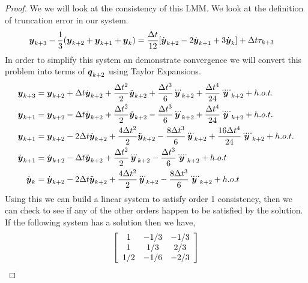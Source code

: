 \documentclass{article}
\begin{document}
\begin{enumerate}[label=\alph*)]
\begin{proof}
        We we will look at the consistency of this LMM. We look at the
        definition of truncation error in our system. 
        \begin{align*}
            \boldsymbol{y}_{k+3} - \frac{1}{3}(\boldsymbol{y}_{k+2} + \boldsymbol{y}_{k+1} + \boldsymbol{y}_{k}) &=
            \frac{\Delta t}{12}[\dot{\boldsymbol{y}}_{k+2} - 2\dot{\boldsymbol{y}}_{k+1} + 3\dot{\boldsymbol{y}}_{k}] + \Delta t
            \tau_{k+3}
        \end{align*}
        In order to simplify this system an demonstrate convergence we will
        convert this problem into terms of $\boldsymbol{q}_{k+2}$ using Taylor
        Expansions.
        \begin{align}
            \boldsymbol{y}_{k+3} &= \boldsymbol{y}_{k+2} + \Delta t \dot{\boldsymbol{y}}_{k+2} +
            \frac{\Delta t^2}{2}\ddot{\boldsymbol{y}}_{k+2} +
            \frac{\Delta t^3}{6}\dddot{\boldsymbol{y}}_{k+2} +
            \frac{\Delta t^4}{24}\ddddot{\boldsymbol{y}}_{k+2} +
            h.o.t.\\
            \boldsymbol{y}_{k+1} &= \boldsymbol{y}_{k+2} - \Delta t \dot{\boldsymbol{y}}_{k+2} +
            \frac{\Delta t^2}{2}\ddot{\boldsymbol{y}}_{k+2} -
            \frac{\Delta t^3}{6}\dddot{\boldsymbol{y}}_{k+2} +
            \frac{\Delta t^4}{24}\ddddot{\boldsymbol{y}}_{k+2} +
            h.o.t.\\
            \boldsymbol{y}_{k+1} &= \boldsymbol{y}_{k+2} - 2\Delta t \dot{\boldsymbol{y}}_{k+2} +
            \frac{4\Delta t^2}{2}\ddot{\boldsymbol{y}}_{k+2} -
            \frac{8\Delta t^3}{6}\dddot{\boldsymbol{y}}_{k+2} +
            \frac{16\Delta t^4}{24}\ddddot{\boldsymbol{y}}_{k+2} +
            h.o.t.\\
            \dot{\boldsymbol{y}}_{k+1} &= \dot{\boldsymbol{y}}_{k+2} - \Delta t \ddot{\boldsymbol{y}}_{k+2} + 
            \frac{\Delta t^2}{2}\dddot{\boldsymbol{y}}_{k+2} -
            \frac{\Delta t^3}{6}\ddddot{\boldsymbol{y}}_{k+2} + h.o.t\\
            \dot{\boldsymbol{y}}_{k} &= \dot{\boldsymbol{y}}_{k+2} - 2\Delta t \ddot{\boldsymbol{y}}_{k+2} + 
            \frac{4\Delta t^2}{2}\dddot{\boldsymbol{y}}_{k+2} -
            \frac{8\Delta t^3}{6}\ddddot{\boldsymbol{y}}_{k+2} + h.o.t
        \end{align}
        Using this we can build a linear system to satisfy order 1 consistency,
        then we can check to see if any of the other orders happen to be
        satisfied by the solution. If the following system has a solution then we
        have, 
        \begin{align*}
            \left[\begin{array}{c c c}1 & -1/3 & -1/3 \\ 1 & 1/3 & 2/3 \\ 1/2 &-1/6 &
            -2/3\end{array}\right]

\end{align*}
\end{proof}
\end{enumerate}
\end{document}
